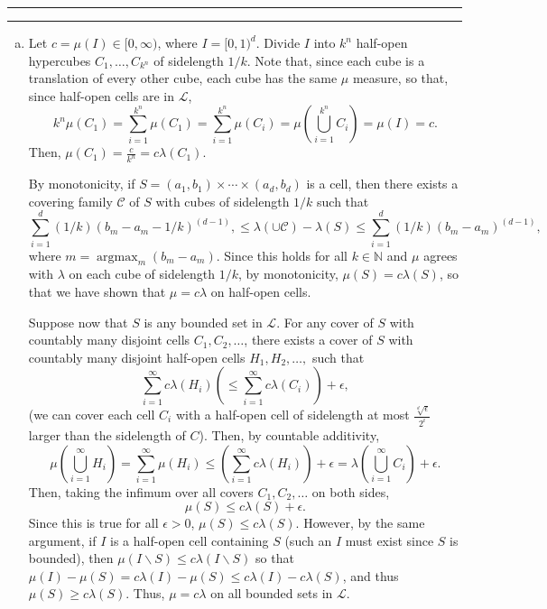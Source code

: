 \documentclass[11pt]{article}
\newcounter{questionCounter}
\newcounter{partCounter}[questionCounter]
\newenvironment{question}[2][\arabic{questionCounter}]{%
    \setcounter{partCounter}{0}%
    \vspace{.25in} \hrule \vspace{0.5em}%
        \noindent{\bf #2}%
    \vspace{0.8em} \hrule \vspace{.10in}%
    \addtocounter{questionCounter}{1}%
}{}
\newcommand{\sminus}{\backslash}
\begin{document}
\begin{question}{Problem 3}
\begin{enumerate}[(a)]
\item Let $c = \mu(I)  \in [0,\infty)$, where $I = [0,1)^d$. Divide $I$ into $k^n$ half-open
hypercubes $C_1,\ldots,C_{k^n}$ of sidelength $1/k$. Note that, since each
cube is a translation of every other cube, each cube has the same $\mu$
measure, so that, since half-open cells are in $\mathcal{L}$,
\[k^n\mu(C_1)
 = \sum_{i = 1}^{k^n} \mu(C_1)
 = \sum_{i = 1}^{k^n} \mu(C_i)
 = \mu\left(\bigcup_{i = 1}^{k^n} C_i\right)
 = \mu(I) = c.
\]
Then, $\mu(C_1) = \frac{c}{k^n} = c\lambda(C_1)$.

By monotonicity, if $S = (a_1,b_1) \times \cdots \times (a_d,b_d)$ is a cell,
then there exists a covering family $\mathcal{C}$ of $S$ with cubes of
sidelength $1/k$ such that
\[\sum_{i = 1}^d (1/k)(b_m - a_m - 1/k)^{(d - 1)},
 \leq \lambda(\cup \mathcal{C}) - \lambda(S)
 \leq \sum_{i = 1}^d (1/k)(b_m - a_m)^{(d - 1)},
\]
where $m = \operatorname{argmax}_m (b_m - a_m)$. Since this holds for all
$k \in \mathbb{N}$ and $\mu$ agrees with $\lambda$ on each cube of sidelength
$1/k$, by monotonicity, $\mu(S) = c\lambda(S)$, so that we have shown that
$\mu = c\lambda$ on half-open cells.

Suppose now that $S$ is any bounded set in $\mathcal{L}$. For any cover of $S$ with countably
many disjoint cells $C_1,C_2,\ldots$, there exists a cover of $S$ with
countably many disjoint half-open cells $H_1,H_2,\ldots,$ such that
\[\sum_{i = 1}^{\infty} c\lambda(H_i)
\left(\leq \sum_{i = 1}^{\infty} c\lambda(C_i)\right) + \epsilon,\]
(we can cover each cell $C_i$ with a half-open cell of sidelength at most
$\frac{\sqrt[d]{\epsilon}}{2^i}$ larger than the sidelength of $C$).
Then, by countable additivity,
\[\mu\left(\bigcup_{i = 1}^{\infty} H_i\right)
= \sum_{i = 1}^{\infty} \mu(H_i)
\leq \left(\sum_{i = 1}^{\infty} c\lambda(H_i)\right) + \epsilon
= \lambda\left(\bigcup_{i = 1}^{\infty} C_i\right) + \epsilon.\]
Then, taking the infimum over all covers $C_1,C_2,\ldots$ on both sides,
\[\mu(S) \leq c\lambda(S) + \epsilon.\]
Since this is true for all $\epsilon > 0$, $\mu(S) \leq c \lambda(S)$.
However, by the same argument, if $I$ is a half-open cell containing $S$ (such
an $I$ must exist since $S$ is bounded), then $\mu(I\sminus S) \leq c\lambda(I\sminus S)$
so that $\mu(I) - \mu(S) = c\lambda(I) - \mu(S) \leq c\lambda(I) - c\lambda(S)$, and thus
$\mu(S) \geq c\lambda(S)$. Thus, $\mu = c\lambda$ on all bounded sets in $\mathcal{L}$.


\end{enumerate}
\end{question}
\end{document}

